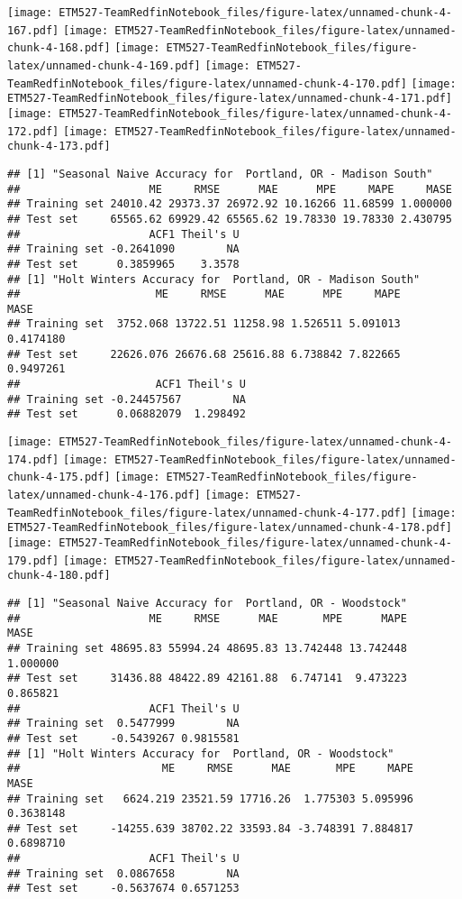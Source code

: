 \documentclass[]{article}
\begin{document}
\texttt{[image: ETM527-TeamRedfinNotebook\_files/figure-latex/unnamed-chunk-4-167.pdf]}
\texttt{[image: ETM527-TeamRedfinNotebook\_files/figure-latex/unnamed-chunk-4-168.pdf]}
\texttt{[image: ETM527-TeamRedfinNotebook\_files/figure-latex/unnamed-chunk-4-169.pdf]}
\texttt{[image: ETM527-TeamRedfinNotebook\_files/figure-latex/unnamed-chunk-4-170.pdf]}
\texttt{[image: ETM527-TeamRedfinNotebook\_files/figure-latex/unnamed-chunk-4-171.pdf]}
\texttt{[image: ETM527-TeamRedfinNotebook\_files/figure-latex/unnamed-chunk-4-172.pdf]}
\texttt{[image: ETM527-TeamRedfinNotebook\_files/figure-latex/unnamed-chunk-4-173.pdf]}

\begin{verbatim}
## [1] "Seasonal Naive Accuracy for  Portland, OR - Madison South"
##                    ME     RMSE      MAE      MPE     MAPE     MASE
## Training set 24010.42 29373.37 26972.92 10.16266 11.68599 1.000000
## Test set     65565.62 69929.42 65565.62 19.78330 19.78330 2.430795
##                    ACF1 Theil's U
## Training set -0.2641090        NA
## Test set      0.3859965    3.3578
## [1] "Holt Winters Accuracy for  Portland, OR - Madison South"
##                     ME     RMSE      MAE      MPE     MAPE      MASE
## Training set  3752.068 13722.51 11258.98 1.526511 5.091013 0.4174180
## Test set     22626.076 26676.68 25616.88 6.738842 7.822665 0.9497261
##                     ACF1 Theil's U
## Training set -0.24457567        NA
## Test set      0.06882079  1.298492
\end{verbatim}

\texttt{[image: ETM527-TeamRedfinNotebook\_files/figure-latex/unnamed-chunk-4-174.pdf]}
\texttt{[image: ETM527-TeamRedfinNotebook\_files/figure-latex/unnamed-chunk-4-175.pdf]}
\texttt{[image: ETM527-TeamRedfinNotebook\_files/figure-latex/unnamed-chunk-4-176.pdf]}
\texttt{[image: ETM527-TeamRedfinNotebook\_files/figure-latex/unnamed-chunk-4-177.pdf]}
\texttt{[image: ETM527-TeamRedfinNotebook\_files/figure-latex/unnamed-chunk-4-178.pdf]}
\texttt{[image: ETM527-TeamRedfinNotebook\_files/figure-latex/unnamed-chunk-4-179.pdf]}
\texttt{[image: ETM527-TeamRedfinNotebook\_files/figure-latex/unnamed-chunk-4-180.pdf]}

\begin{verbatim}
## [1] "Seasonal Naive Accuracy for  Portland, OR - Woodstock"
##                    ME     RMSE      MAE       MPE      MAPE     MASE
## Training set 48695.83 55994.24 48695.83 13.742448 13.742448 1.000000
## Test set     31436.88 48422.89 42161.88  6.747141  9.473223 0.865821
##                    ACF1 Theil's U
## Training set  0.5477999        NA
## Test set     -0.5439267 0.9815581
## [1] "Holt Winters Accuracy for  Portland, OR - Woodstock"
##                      ME     RMSE      MAE       MPE     MAPE      MASE
## Training set   6624.219 23521.59 17716.26  1.775303 5.095996 0.3638148
## Test set     -14255.639 38702.22 33593.84 -3.748391 7.884817 0.6898710
##                    ACF1 Theil's U
## Training set  0.0867658        NA
## Test set     -0.5637674 0.6571253
\end{verbatim}
\end{document}
